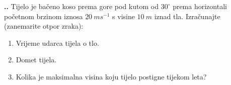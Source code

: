 

\noindent 
\textbf{
\thecjelina.\thezadatak.}
Tijelo je bačeno koso prema gore pod kutom od $30^\circ$ prema horizontali početnom brzinom iznosa $20\ ms^{-1}$ 
s visine $10\ m $ iznad tla. Izračunajte (zanemarite otpor zraka):
\begin{enumerate}[label=\alph*)]
 \item Vrijeme udarca tijela o tlo.
 \item Domet tijela.
 \item Kolika je maksimalna visina koju tijelo postigne tijekom leta?
\end{enumerate}
